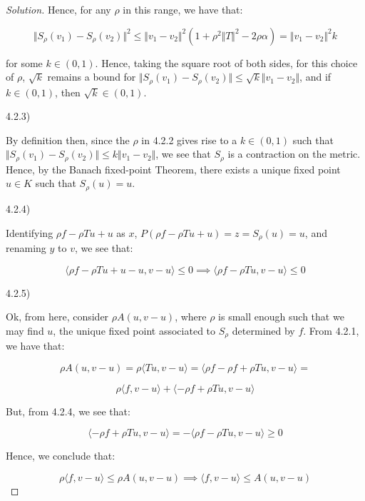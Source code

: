 \documentclass[10pt]{article}
\begin{document}
\begin{proof}[Solution]
Hence, for any $\rho$ in this range, we have that:

$$  \Vert S_\rho(v_1) - S_\rho(v_2) \Vert^2 \leq \Vert v_1 - v_2 \Vert^2 ( 1 + \rho^2 \Vert T\Vert^2 - 2 \rho \alpha) = \Vert v_1 - v_2 \Vert^2  k $$

for some $k \in (0,1)$. Hence, taking the square root of both sides, for this choice of $\rho$, $\sqrt{k}$ remains a bound for $\Vert  S_\rho(v_1) - S_\rho(v_2) \Vert \leq \sqrt{k} \Vert v_1 - v_2 \Vert$, and if $k \in (0,1)$, then $\sqrt{k} \in (0,1)$. 

4.2.3)

By definition then, since the $\rho$ in 4.2.2 gives rise to a $k \in (0,1)$ such that $ \Vert  S_\rho(v_1) - S_\rho(v_2)  \Vert \leq k  \Vert v_1 - v_2 \Vert$, we see that $S_\rho$ is a contraction on the metric. Hence, by the Banach fixed-point Theorem, there exists a unique fixed point $u \in K$ such that $S_\rho(u) = u$.


4.2.4)

Identifying $ \rho f - \rho T u + u$ as $x$, $P( \rho f - \rho T u + u) = z = S_\rho(u) = u$, and renaming $y$ to $v$, we see that:

$$\langle \rho f - \rho Tu + u - u, v - u \rangle \leq 0 \implies \langle \rho f - \rho Tu, v - u \rangle \leq 0$$

4.2.5)

Ok, from here, consider $\rho A(u, v - u)$, where $\rho$ is small enough such that we may find $u$, the unique fixed point associated to $S_\rho$ determined by $f$. From 4.2.1, we have that:

$$ \rho A(u, v -u) = \rho \langle Tu, v - u \rangle = \langle \rho f - \rho f + \rho T u, v - u \rangle = $$

$$ \rho \langle f, v - u \rangle + \langle - \rho f + \rho Tu, v - u \rangle$$

But, from 4.2.4, we see that:

$$ \langle - \rho f + \rho Tu, v - u \rangle  = -  \langle \rho f - \rho Tu, v - u \rangle \geq 0 $$

Hence, we conclude that:

$$ \rho \langle f, v - u \rangle \leq \rho A(u, v - u) \implies \langle f, v - u \rangle \leq A(u, v - u) $$





\end{proof}
\end{document}
